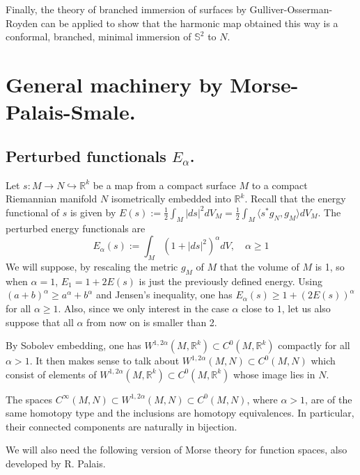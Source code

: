 Finally, the theory of branched immersion of surfaces by Gulliver-Osserman-Royden
\cite{gulliver_theory_1973} can be applied to show that the harmonic map obtained this way
is a conformal, branched, minimal immersion of \(\mathbb{S}^2\) to \(N\).

\section{General machinery by Morse-Palais-Smale.}
\label{sec:org369b6f1}

\subsection{Perturbed functionals \(E_\alpha\).}
\label{sec:org2619de2}

Let \(s: M \longrightarrow N \hookrightarrow \mathbb{R}^k\) be a map from a compact
surface \(M\) to a compact Riemannian manifold \(N\) isometrically embedded into \(\mathbb{R}^k\). Recall that the energy functional of \(s\) is given by \(E(s):=
\frac{1}{2}\int_M |ds|^2 dV_M = \frac{1}{2}\int_M \langle s^* g_N, g_M \rangle dV_M\). The perturbed energy functionals are
\[
 E_\alpha(s) := \int_M\left(1 + |ds|^2\right)^\alpha dV,\quad \alpha \geq 1
\]
We will suppose, by rescaling the metric \(g_M\) of \(M\) that the volume of \(M\)
is 1, so when \(\alpha=1\), \(E_1 =  1+ 2E(s)\) is just the previously defined energy. Using \((a+b)^\alpha \geq a^\alpha + b^\alpha\) and Jensen's inequality, one has \(E_\alpha(s) \geq 1 + (2E(s))^\alpha\) for all \(\alpha \geq 1\). Also, since we only
interest in the case \(\alpha\) close to \(1\), let us also suppose that all \(\alpha\) from now on is smaller than 2.

By Sobolev embedding, one has \(W^{1,2\alpha}(M, \mathbb{R}^k) \subset C^0(M,
\mathbb{R}^k)\) compactly for all \(\alpha >1\). It then makes sense to talk about \(W^{1,2\alpha}(M,N) \subset C^0(M,N)\) which consist of elements of \(W^{1,2\alpha}(M,
\mathbb{R}^k)\subset C^0(M, \mathbb{R}^k)\) whose image lies in \(N\).

\begin{theorem}[Palais]
\label{thm:Palais-1}
The spaces \(C^\infty (M,N)\subset W^{1,2\alpha}(M,N)\subset C^0(M,N)\), where \(\alpha>1\), are
of the same homotopy type and the inclusions are homotopy equivalences. In particular,
their connected components are naturally in bijection.
\end{theorem}

We will also need the following version of Morse theory for function spaces, also
developed by R. Palais.

